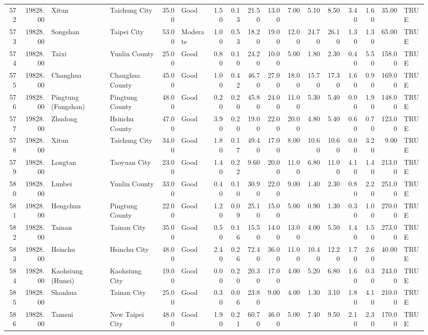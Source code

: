 \begin{table}[ht]
\begin{tabular}{rrllrlrrrrrrrrrrl}
  572 & 19828.00 & Xitun & Taichung City & 35.00 & Good & 1.50 & 0.13 & 21.50 & 13.00 & 7.00 & 5.10 & 8.50 & 3.40 & 1.60 & 35.00 & TRUE \\ 
  573 & 19828.00 & Songshan & Taipei City & 53.00 & Moderate & 1.00 & 0.53 & 18.20 & 19.00 & 12.00 & 24.70 & 26.10 & 1.30 & 1.30 & 65.00 & TRUE \\ 
  574 & 19828.00 & Taixi & Yunlin County & 25.00 & Good & 0.80 & 0.10 & 24.20 & 10.00 & 5.00 & 1.80 & 2.30 & 0.40 & 5.50 & 158.00 & TRUE \\ 
  575 & 19828.00 & Changhua & Changhua County & 45.00 & Good & 1.00 & 0.42 & 46.70 & 27.00 & 18.00 & 15.70 & 17.30 & 1.60 & 0.90 & 169.00 & TRUE \\ 
  576 & 19828.00 & Pingtung (Fangshan) & Pingtung County & 48.00 & Good & 0.20 & 0.20 & 45.80 & 24.00 & 11.00 & 5.30 & 5.40 & 0.00 & 1.90 & 148.00 & TRUE \\ 
  577 & 19828.00 & Zhudong & Hsinchu County & 47.00 & Good & 3.90 & 0.20 & 19.00 & 22.00 & 20.00 & 4.80 & 5.40 & 0.60 & 0.70 & 123.00 & TRUE \\ 
  578 & 19828.00 & Xitun & Taichung City & 34.00 & Good & 1.80 & 0.17 & 49.40 & 17.00 & 8.00 & 10.60 & 10.60 & 0.00 & 3.20 & 9.00 & TRUE \\ 
  579 & 19828.00 & Longtan & Taoyuan City & 23.00 & Good & 1.40 & 0.22 & 9.60 & 20.00 & 11.00 & 6.80 & 11.00 & 4.10 & 1.40 & 213.00 & TRUE \\ 
  580 & 19828.00 & Lunbei & Yunlin County & 33.00 & Good & 0.40 & 0.10 & 30.90 & 22.00 & 9.00 & 1.40 & 2.30 & 0.80 & 2.20 & 251.00 & TRUE \\ 
  581 & 19828.00 & Hengchun & Pingtung County & 22.00 & Good & 1.20 & 0.09 & 25.10 & 15.00 & 5.00 & 0.90 & 1.30 & 0.30 & 1.00 & 270.00 & TRUE \\ 
  582 & 19828.00 & Tainan & Tainan City & 35.00 & Good & 0.50 & 0.16 & 15.50 & 14.00 & 13.00 & 4.00 & 5.50 & 1.40 & 1.50 & 273.00 & TRUE \\ 
  583 & 19828.00 & Hsinchu & Hsinchu City & 48.00 & Good & 2.40 & 0.26 & 72.40 & 36.00 & 11.00 & 10.40 & 12.20 & 1.70 & 2.60 & 40.00 & TRUE \\ 
  584 & 19828.00 & Kaohsiung (Hunei) & Kaohsiung City & 19.00 & Good & 0.00 & 0.20 & 20.30 & 17.00 & 4.00 & 5.20 & 6.80 & 1.60 & 0.30 & 243.00 & TRUE \\ 
  585 & 19828.00 & Shanhua & Tainan City & 25.00 & Good & 0.30 & 0.06 & 23.80 & 9.00 & 4.00 & 1.30 & 3.10 & 1.80 & 4.10 & 210.00 & TRUE \\ 
  586 & 19828.00 & Tamsui & New Taipei City & 48.00 & Good & 1.90 & 0.21 & 60.70 & 46.00 & 5.00 & 7.40 & 9.50 & 2.10 & 2.30 & 170.00 & TRUE \\ 

\end{tabular}
\end{table}
